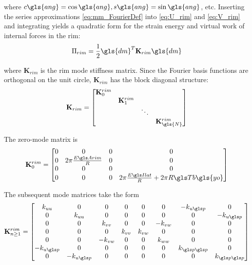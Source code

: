 \documentclass[\rootdir/thesis.tex]{subfiles}
\begin{document}
where $c\gls{ang}=\cos{\gls{ang}}, s\gls{ang}=\sin{\gls{ang}}$, etc. Inserting the series approximations \eqref{eq:mm_FourierDef} into \eqref{eq:U_rim} and \eqref{eq:V_rim} and integrating yields a quadratic form for the strain energy and virtual work of internal forces in the rim:
\begin{equation}
\label{eq:mm_U_rim}
\Pi_{rim} = \frac{1}{2} \gls{dm}^T \mathbf{K}_{rim} \gls{dm}
\end{equation}

where $\mathbf{K}_{rim}$ is the rim mode stiffness matrix. Since the Fourier basis functions are orthogonal on the unit circle, $\mathbf{K}_{rim}$ has the block diagonal structure:
\begin{equation}
\label{eq:mm_K_rim}
\mathbf{K}_{rim} =
\begin{bmatrix}
\mathbf{K}_0^{rim} & & &\\
& \mathbf{K}_1^{rim} & &\\
& & \ddots &\\
& & & \mathbf{K}_{\gls{N}}^{rim}
\end{bmatrix}
\end{equation}

The zero-mode matrix is
\begin{equation}
\mathbf{K}_0^{rim} =
\begin{bmatrix}
0 & 0 & 0 & 0\\
0 & 2\pi \frac{\EA}{R} & 0 & 0\\
0 & 0 & 0 & 0\\
0 & 0 & 0 & 2\pi \frac{\EIl}{R} + 2\pi R\Tb\gls{yo}
\end{bmatrix}
\end{equation}

The subsequent mode matrices take the form
\begin{equation}
\mathbf{K}_{n\geq 1}^{rim} =
\begin{bmatrix}
k_{uu} & 0 & 0 & 0 & 0 & 0 & -k_{u\p} & 0\\
0 & k_{uu} & 0 & 0 & 0 & 0 & 0 & -k_{u\p}\\
0 & 0 & k_{vv} & 0 & 0 & -k_{vw} & 0 & 0\\
0 & 0 & 0 & k_{vv} & k_{vw} & 0 & 0 & 0\\
0 & 0 & -k_{vw} & 0 & 0 & k_{ww} & 0 & 0\\
-k_{u\p} & 0 & 0 & 0 & 0 & 0 & k_{\p\p} & 0\\
0 & -k_{u\p} & 0 & 0 & 0 & 0 & 0 & k_{\p\p}
\end{bmatrix}
\end{equation}
\end{document}
